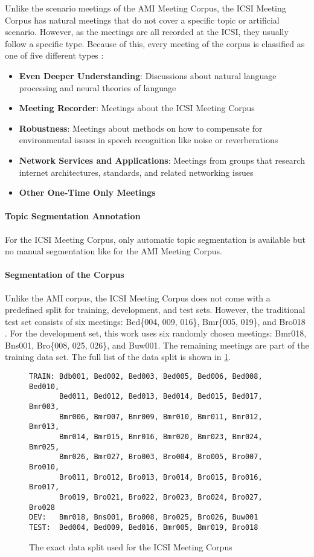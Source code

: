 Unlike the scenario meetings of the AMI Meeting Corpus, the ICSI Meeting Corpus has natural meetings that do not cover a specific topic or artificial scenario.
However, as the meetings are all recorded at the ICSI, they usually follow a specific type.
Because of this, every meeting of the corpus is classified as one of five different types \cite{Janin}:
\begin{itemize}
\item \textbf{Even Deeper Understanding}: Discussions about natural language processing and neural theories of language
\item \textbf{Meeting Recorder}: Meetings about the ICSI Meeting Corpus
\item \textbf{Robustness}: Meetings about methods on how to compensate for environmental issues in speech recognition like noise or reverberations
\item \textbf{Network Services and Applications}: Meetings from groups that research internet architectures, standards, and related networking issues
\item \textbf{Other One-Time Only Meetings}
\end{itemize}

\paragraph{Topic Segmentation Annotation}

For the ICSI Meeting Corpus, only automatic topic segmentation is available but no manual segmentation like for the AMI Meeting Corpus.

\paragraph{Segmentation of the Corpus}

Unlike the AMI corpus, the ICSI Meeting Corpus does not come with a predefined split for training, development, and test sets.
However, the traditional test set consists of six meetings: Bed\{004, 009, 016\}, Bmr\{005, 019\}, and Bro018 \cite{inproceedings}.
For the development set, this work uses six randomly chosen meetings: Bmr018, Bns001, Bro\{008, 025, 026\}, and Buw001.
The remaining meetings are part of the training data set.
The full list of the data split is shown in \cref{fig:icsi-split}.

\begin{figure}[h]
\begin{lstlisting}[numbers=none]
TRAIN: Bdb001, Bed002, Bed003, Bed005, Bed006, Bed008, Bed010,
       Bed011, Bed012, Bed013, Bed014, Bed015, Bed017, Bmr003,
       Bmr006, Bmr007, Bmr009, Bmr010, Bmr011, Bmr012, Bmr013,
       Bmr014, Bmr015, Bmr016, Bmr020, Bmr023, Bmr024, Bmr025, 
       Bmr026, Bmr027, Bro003, Bro004, Bro005, Bro007, Bro010,
       Bro011, Bro012, Bro013, Bro014, Bro015, Bro016, Bro017,
       Bro019, Bro021, Bro022, Bro023, Bro024, Bro027, Bro028
DEV:   Bmr018, Bns001, Bro008, Bro025, Bro026, Buw001
TEST:  Bed004, Bed009, Bed016, Bmr005, Bmr019, Bro018
\end{lstlisting}
\caption{The exact data split used for the ICSI Meeting Corpus}
\label{fig:icsi-split}
\end{figure}

